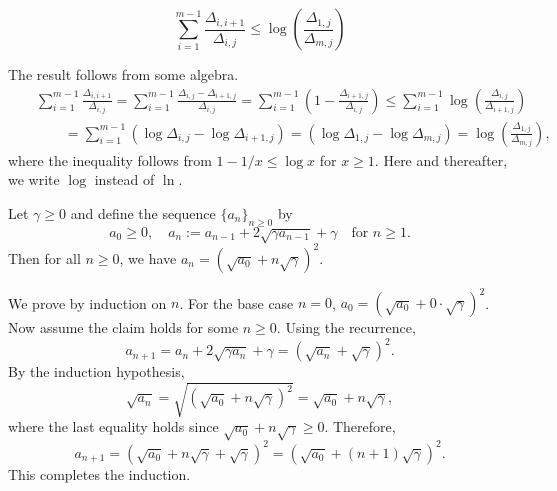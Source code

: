 \documentclass[opre,blindrev]{informs3}
\begin{document}
\begin{APPENDICES}
\begin{lemma}\label{lem:sum-of-ratios}
    \[\sum_{i=1}^{m-1}\frac{\Delta_{i,i+1}}{\Delta_{i,j}}\leq \log\left(\frac{\Delta_{1,j}}{\Delta_{m,j}}\right)\]
\end{lemma}
    The result follows from some algebra.
\begin{eqnarray*}
    &&\sum_{i=1}^{m-1} \frac{\Delta_{i,i+1}}{\Delta_{i,j}}
        = \sum_{i=1}^{m-1} \frac{\Delta_{i,j}-\Delta_{i+1,j}}{\Delta_{i,j}}
        = \sum_{i=1}^{m-1} \left(1 - \frac{\Delta_{i+1,j}}{\Delta_{i,j}}\right)
        \leq  \sum_{i=1}^{m-1} \log\left( \frac{\Delta_{i,j}}{\Delta_{i+1,j}}\right)\\
       &&\qquad =\sum_{i=1}^{m-1}\left( \log \Delta_{i,j} - \log\Delta_{i+1,j}\right)
        =\left( \log \Delta_{1,j} - \log\Delta_{m,j}\right)
        =\log\left(\frac{\Delta_{1,j}}{\Delta_{m,j}}\right),
  \end{eqnarray*}
  where the inequality follows from $1-1/x\leq \log x$ for $x\ge 1$. 
  Here and thereafter, we write \(\log\) instead of \(\ln\).
\Halmos  

\begin{lemma}\label{lem:exact-quadratic}
    Let \(\gamma \ge 0\) and define the sequence \(\{a_n\}_{n\ge 0}\) by
    \[
        a_0 \geq 0,
        \quad
        a_n := a_{n-1} + 2\sqrt{\gamma  a_{n-1}} + \gamma
        \quad\text{for } n\ge 1.
    \]
    Then for all \(n\ge 0\), we have \(a_n = \left(\sqrt{a_0}+n\sqrt{\gamma}\right)^2\).
\end{lemma}

    We prove by induction on \(n\). For the base case \(n=0\), \(a_0=\left(\sqrt{a_0}+0\cdot \sqrt{\gamma}\right)^2\). Now assume the claim holds for some \(n\ge 0\). Using the recurrence,
    \[
    a_{n+1} = a_n+2\sqrt{\gamma a_n}+\gamma = \left(\sqrt{a_n}+\sqrt{\gamma}\right)^2.
    \]
    By the induction hypothesis,
    \[
    \sqrt{a_n}
    = \sqrt{\left(\sqrt{a_0}+n\sqrt{\gamma}\right)^2}
    = \sqrt{a_0}+n\sqrt{\gamma},
    \]
    where the last equality holds since \(\sqrt{a_0}+n\sqrt{\gamma}\ge 0\). Therefore,
    \[
    a_{n+1}
    = \left(\sqrt{a_0}+n\sqrt{\gamma}+\sqrt{\gamma}\right)^2
    = \left(\sqrt{a_0}+(n+1)\sqrt{\gamma}\right)^2.
    \]
    This completes the induction.
\Halmos

\end{APPENDICES}
\end{document}
